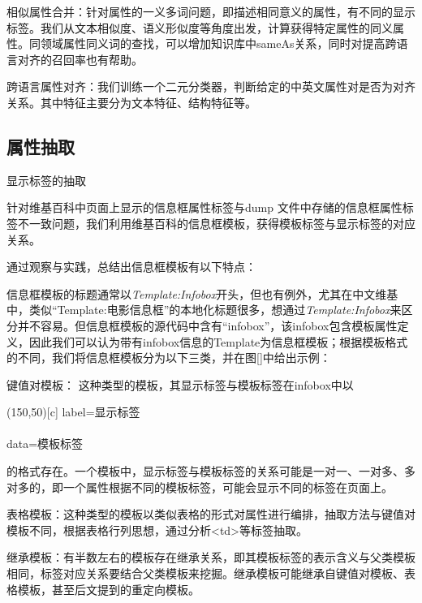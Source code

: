 {\heiti 相似属性合并：}针对属性的一义多词问题，即描述相同意义的属性，有不同的显示标签。我们从文本相似度、语义形似度等角度出发，计算获得特定属性的同义属性。同领域属性同义词的查找，可以增加知识库中sameAs关系，同时对提高跨语言对齐的召回率也有帮助。

{\heiti 跨语言属性对齐：}我们训练一个二元分类器，判断给定的中英文属性对是否为对齐关系。其中特征主要分为文本特征、结构特征等。

\subsection{属性抽取}
\label{sec:property-extraction}

显示标签的抽取

针对维基百科中页面上显示的信息框属性标签与dump 文件中存储的信息框属性标签不一致问题，我们利用维基百科的信息框模板，获得模板标签与显示标签的对应关系。

通过观察与实践，总结出信息框模板有以下特点：

信息框模板的标题通常以\textit{Template:Infobox}开头，但也有例外，尤其在中文维基中，类似“Template:电影信息框”的本地化标题很多，想通过\textit{Template:Infobox}来区分并不容易。但信息框模板的源代码中含有“infobox”，该infobox包含模板属性定义，因此我们可以认为带有infobox信息的Template为信息框模板；根据模板格式的不同，我们将信息框模板分为以下三类，并在图\ref{}中给出示例：

{\heiti 键值对模板：} 这种类型的模板，其显示标签与模板标签在infobox中以

\begin{table}[ht]
  \begin{minipage}{0.4\linewidth}
    \centering
    \caption*{}
    \label{tab:key-value}
      \framebox(150,50)[c]{
          label=显示标签\\
          \\
          data=模板标签
          }
  \end{minipage}%
  \hfill%
\end{table}

的格式存在。一个模板中，显示标签与模板标签的关系可能是一对一、一对多、多对多的，即一个属性根据不同的模板标签，可能会显示不同的标签在页面上。

{\heiti 表格模板：}这种类型的模板以类似表格的形式对属性进行编排，抽取方法与键值对模板不同，根据表格行列思想，通过分析<td>等标签抽取。

{\heiti 继承模板：}有半数左右的模板存在继承关系，即其模板标签的表示含义与父类模板相同，标签对应关系要结合父类模板来挖掘。继承模板可能继承自键值对模板、表格模板，甚至后文提到的重定向模板。

